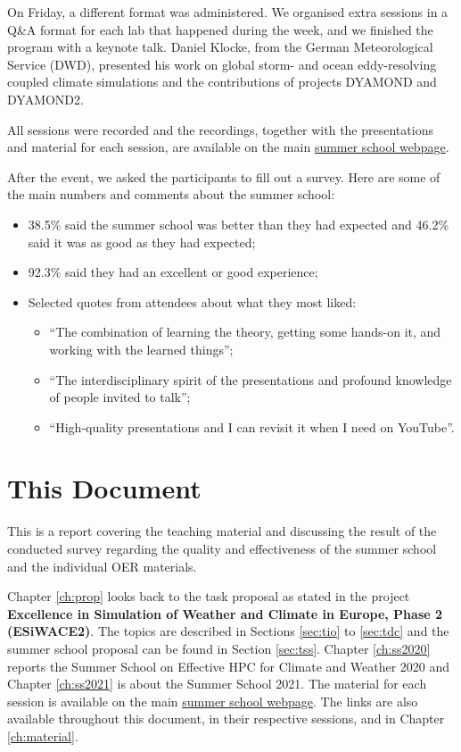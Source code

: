 On Friday, a different format was administered. We organised extra sessions in a Q\&A format for each lab that happened during the week, and we finished the program with a keynote talk. Daniel Klocke, from the German Meteorological Service (DWD), presented his work on global storm- and ocean eddy-resolving coupled climate simulations and the contributions of projects DYAMOND and DYAMOND2.

All sessions were recorded and the recordings, together with the presentations and material for each session, are available on the main \href{https://hps.vi4io.org/events/2020/esiwace-school}{summer school webpage}.

After the event, we asked the participants to fill out a survey. Here are some of the main numbers and comments about the summer school:

\begin{itemize}

\item 38.5\% said the summer school was better than they had expected and 46.2\% said it was as good as they had expected;

\item 92.3\% said they had an excellent or good experience;

\item Selected quotes from attendees about what they most liked:

\begin{itemize}

\item ``The combination of learning the theory, getting some hands-on it, and working with the learned things'';
\item ``The interdisciplinary spirit of the presentations and profound knowledge of people invited to talk'';
\item ``High-quality presentations and I can revisit it when I need on YouTube''.

\end{itemize}

\end{itemize}

\section{This Document}

This is a report covering the teaching material and discussing the result of the conducted survey regarding the quality and effectiveness of the summer school and the individual OER materials.

Chapter \ref{ch:prop} looks back to the task proposal as stated in the project \textbf{Excellence in Simulation of Weather and Climate in Europe, Phase 2 (ESiWACE2)}. The topics are described in Sections \ref{sec:tio} to \ref{sec:tdc} and the summer school proposal can be found in Section \ref{sec:tss}.
Chapter \ref{ch:ss2020} reports the Summer School on Effective HPC for Climate and Weather 2020 and Chapter \ref{ch:ss2021} is about the Summer School 2021.
The material for each session is available on the main \href{https://hps.vi4io.org/events/2020/esiwace-school}{summer school webpage}. The links are also available throughout this document, in their respective sessions, and in Chapter \ref{ch:material}.
